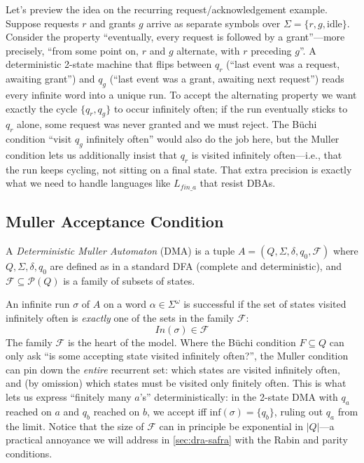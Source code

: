 Let's preview the idea on the recurring request/acknowledgement example. Suppose requests $r$ and grants $g$ arrive as separate symbols over $\Sigma = \{r, g, \mathrm{idle}\}$. Consider the property ``eventually, every request is followed by a grant''---more precisely, ``from some point on, $r$ and $g$ alternate, with $r$ preceding $g$''. A deterministic 2-state machine that flips between $q_r$ (``last event was a request, awaiting grant'') and $q_g$ (``last event was a grant, awaiting next request'') reads every infinite word into a unique run. To accept the alternating property we want exactly the cycle $\{q_r, q_g\}$ to occur infinitely often; if the run eventually sticks to $q_r$ alone, some request was never granted and we must reject. The Büchi condition ``visit $q_g$ infinitely often'' would also do the job here, but the Muller condition lets us additionally insist that $q_r$ is visited infinitely often---i.e., that the run keeps cycling, not sitting on a final state. That extra precision is exactly what we need to handle languages like $L_{fin\_a}$ that resist DBAs.

\subsection{Muller Acceptance Condition}
\label{subsec:muller-def}

\begin{definition}
A \emph{Deterministic Muller Automaton} (DMA) is a tuple $A = (Q, \Sigma, \delta, q_0, \mathcal{F})$ where $Q, \Sigma, \delta, q_0$ are defined as in a standard DFA (complete and deterministic), and $\mathcal{F} \subseteq \mathcal{P}(Q)$ is a family of subsets of states.
\end{definition}

An infinite run $\sigma$ of $A$ on a word $\alpha \in \Sigma^\omega$ is successful if the set of states visited infinitely often is \emph{exactly} one of the sets in the family $\mathcal{F}$:
$$In(\sigma) \in \mathcal{F}$$
The family $\mathcal{F}$ is the heart of the model. Where the Büchi condition $F \subseteq Q$ can only ask ``is some accepting state visited infinitely often?'', the Muller condition can pin down the \emph{entire} recurrent set: which states are visited infinitely often, and (by omission) which states must be visited only finitely often. This is what lets us express ``finitely many $a$'s'' deterministically: in the 2-state DMA with $q_a$ reached on $a$ and $q_b$ reached on $b$, we accept iff $\mathrm{inf}(\sigma) = \{q_b\}$, ruling out $q_a$ from the limit. Notice that the size of $\mathcal{F}$ can in principle be exponential in $|Q|$---a practical annoyance we will address in \cref{sec:dra-safra} with the Rabin and parity conditions.

